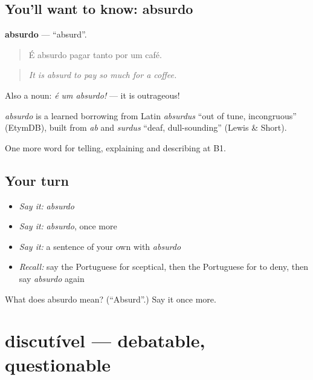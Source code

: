 \subsection*{You'll want to know: absurdo}
\textbf{absurdo} — \textquotedblleft{}absurd\textquotedblright{}.

\begin{quote}
É absurdo pagar tanto por um café.
\end{quote}

\begin{quote}
\emph{It is absurd to pay so much for a coffee.}
\end{quote}

Also a noun: \emph{é um absurdo!} — it is outrageous!

\begin{cousinweb}
\emph{absurdo} is a learned borrowing from Latin \emph{absurdus} \textquotedblleft{}out of tune, incongruous\textquotedblright{} (EtymDB), built from \emph{ab} and \emph{surdus} \textquotedblleft{}deaf, dull-sounding\textquotedblright{} (Lewis \& Short).
\end{cousinweb}

\begin{grammarlens}[title={What you've built}]
One more word for telling, explaining and describing at B1.
\end{grammarlens}

\subsection*{Your turn}
\begin{itemize}
\raggedright
  \item \emph{Say it:} \emph{absurdo}
  \item \emph{Say it:} \emph{absurdo}, once more
  \item \emph{Say it:} a sentence of your own with \emph{absurdo}
  \item \emph{Recall:} say the Portuguese for sceptical, then the Portuguese for to deny, then say \emph{absurdo} again
\end{itemize}

\begin{tcolorbox}[breakable,colback=teal!4,colframe=teal!35!black,title={Before you move on}]
What does absurdo mean? (\textquotedblleft{}Absurd\textquotedblright{}.) Say it once more.
\end{tcolorbox}
\section[discutível]{discutível — debatable, questionable}

